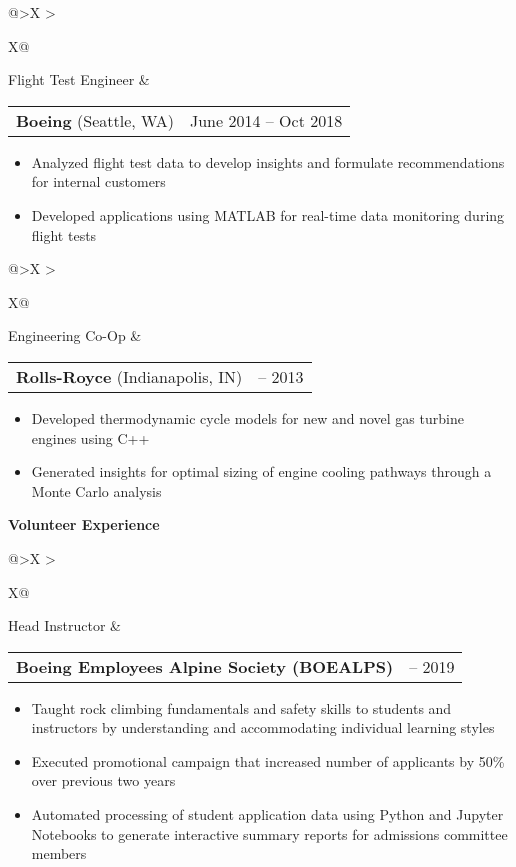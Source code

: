 \documentclass[10pt, letterpaper]{article}
\makeatletter
\newlength{\mylcolwidth}
\renewcommand{\section}[1]{
	\ignorespaces\vspace{0.6em}
	{\fontspec{Helvetica Neue Medium}\color{text}\Large\textbf{#1}} \hrulefill
	\vspace{1.5em}}
\newcommand{\job}[5]{
	\begin{tabularx}{\textwidth}{@{}>{\raggedleft\arraybackslash\setlength\hsize{\mylcolwidth}}X >{\raggedright\arraybackslash}X@{}}
		#3 &
		{\begin{tabularx}{\hsize}{@{}>{\raggedright\arraybackslash}X @{}>{\raggedleft\arraybackslash}X@{}}
			\phantom{>}\hspace{\labelsep}\textbf{#1} (#2) & #4
		\end{tabularx}}
		#5
	\end{tabularx}}
\newcommand{\volunteer}[4]{
	\begin{tabularx}{\textwidth}{@{}>{\raggedleft\arraybackslash\setlength\hsize{\mylcolwidth}}X >{\raggedright\arraybackslash}X@{}}
		#3 &
		{\begin{tabularx}{\hsize}{@{}>{\raggedright\arraybackslash\setlength\hsize{5in}}X @{}>{\raggedleft\arraybackslash}X@{}}
				\phantom{>}\hspace{\labelsep}\textbf{#1} & #2
		\end{tabularx}}
		#4
	\end{tabularx}}
\makeatother
\begin{document}
	\job
		{Boeing} %
		{Seattle, WA} %
		{Flight Test Engineer} %
		{June 2014 -- Oct 2018} %
		{\begin{itemize}[>]
			\item Analyzed flight test data to develop insights and formulate recommendations for internal customers
			\item Developed applications using MATLAB for real-time data monitoring during flight tests
		\end{itemize}}
	
	\job{Rolls-Royce}{Indianapolis, IN}{Engineering Co-Op}{2012 -- 2013}
	{\begin{itemize}[>]
			\item Developed thermodynamic cycle models for new and novel gas turbine engines using C++
			\item Generated insights for optimal sizing of engine cooling pathways through a Monte Carlo analysis
	\end{itemize}}
	

	
	\section{Volunteer Experience}
	
	\volunteer
	{Boeing Employees Alpine Society (BOEALPS)}
	{2017 -- 2019}
	{Head Instructor}
	{\begin{itemize}[>]
		\item Taught rock climbing fundamentals and safety skills to students and instructors by understanding and accommodating individual learning styles
		\item Executed promotional campaign that increased number of applicants by 50\% over previous two years
		\item Automated processing of student application data using Python and Jupyter Notebooks to generate interactive summary reports for admissions committee members
	\end{itemize}}
\end{document}
